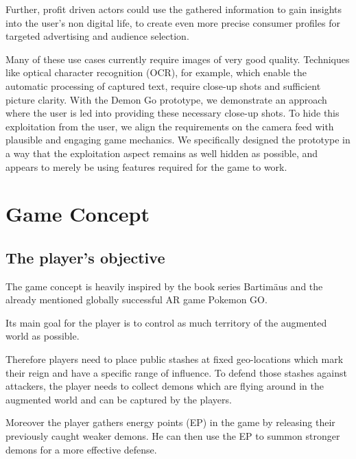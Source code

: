Further, profit driven actors could use the gathered information to gain insights into the user's non digital life, to create even more precise consumer profiles for targeted advertising and audience selection.

Many of these use cases currently require images of very good quality.
Techniques like optical character recognition (OCR), for example, which enable the automatic processing of captured text, require close-up shots and sufficient picture clarity.
With the Demon Go prototype, we demonstrate an approach where the user is led into providing these necessary close-up shots.
To hide this exploitation from the user, we align the requirements on the camera feed with plausible and engaging game mechanics.
We specifically designed the prototype in a way that the exploitation aspect remains as well hidden as possible, and appears to merely be using features required for the game to work.

\section{Game Concept}
\label{sec:concept}


\subsection{The player's objective}
The game concept is heavily inspired by the book series Bartimäus and the already mentioned globally successful AR game Pokemon GO.

Its main goal for the player is to control as much territory of the augmented world as possible.

Therefore players need to place public stashes at fixed geo-locations which mark their reign and have a specific range of influence. 
To defend those stashes against attackers, the player needs to collect demons which are flying around in the augmented world and can be captured by the players. 

Moreover the player gathers energy points (EP) in the game by releasing their previously caught weaker demons. He can then use the EP to summon stronger demons for a more effective defense.

